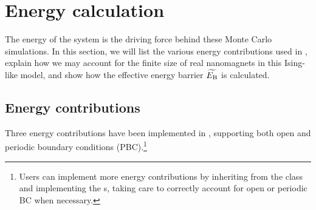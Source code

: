 \section{Energy calculation}
The energy of the system is the driving force behind these Monte Carlo simulations.
In this section, we will list the various energy contributions used in \hotspice, explain how we may account for the finite size of real nanomagnets in this Ising-like model, and show how the effective energy barrier $\widetilde{E_\mathrm{B}}$ is calculated.

\subsection{Energy contributions}
Three energy contributions have been implemented in \hotspice, supporting both open and periodic boundary conditions (PBC).\footnote{
	Users can implement more energy contributions by inheriting from the  class and implementing the s, taking care to correctly account for open or periodic BC when necessary.
}
